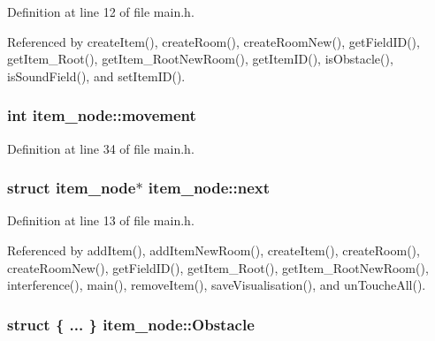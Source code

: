 Definition at line 12 of file main.\+h.



Referenced by create\+Item(), create\+Room(), create\+Room\+New(), get\+Field\+I\+D(), get\+Item\+\_\+\+Root(), get\+Item\+\_\+\+Root\+New\+Room(), get\+Item\+I\+D(), is\+Obstacle(), is\+Sound\+Field(), and set\+Item\+I\+D().

\subsubsection[{movement}]{\setlength{\rightskip}{0pt plus 5cm}int item\+\_\+node\+::movement}\hypertarget{structitem__node_ad21d3205184a0bb91a381471d83c1f09}{}\label{structitem__node_ad21d3205184a0bb91a381471d83c1f09}


Definition at line 34 of file main.\+h.

\subsubsection[{next}]{\setlength{\rightskip}{0pt plus 5cm}struct {\bf item\+\_\+node}$\ast$ item\+\_\+node\+::next}\hypertarget{structitem__node_a2a6860b76bc81310d19f79695a80f58c}{}\label{structitem__node_a2a6860b76bc81310d19f79695a80f58c}


Definition at line 13 of file main.\+h.



Referenced by add\+Item(), add\+Item\+New\+Room(), create\+Item(), create\+Room(), create\+Room\+New(), get\+Field\+I\+D(), get\+Item\+\_\+\+Root(), get\+Item\+\_\+\+Root\+New\+Room(), interference(), main(), remove\+Item(), save\+Visualisation(), and un\+Touche\+All().

\subsubsection[{Obstacle}]{\setlength{\rightskip}{0pt plus 5cm}struct \{ ... \}   item\+\_\+node\+::\+Obstacle}\hypertarget{structitem__node_a10c54e03efef949ca5c2c13dc953a11f}{}\label{structitem__node_a10c54e03efef949ca5c2c13dc953a11f}

